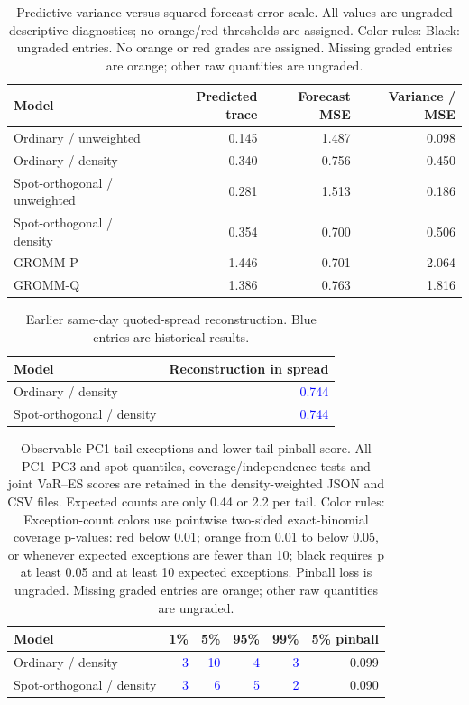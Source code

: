 \documentclass[11pt]{article}
\begin{document}
\begin{table}[H]\centering\small\setlength{\tabcolsep}{4pt}
\caption{Predictive variance versus squared forecast-error scale. All values are ungraded descriptive diagnostics; no orange/red thresholds are assigned. Color rules: Black: ungraded entries. No orange or red grades are assigned. Missing graded entries are orange; other raw quantities are ungraded.}\label{tab:density-calibration}
\begin{tabular}{@{}lrrr@{}}
\toprule
Model & Predicted trace & Forecast MSE & Variance / MSE \\
\midrule
Ordinary / unweighted & 0.145 & 1.487 & 0.098 \\
Ordinary / density & 0.340 & 0.756 & 0.450 \\
Spot-orthogonal / unweighted & 0.281 & 1.513 & 0.186 \\
Spot-orthogonal / density & 0.354 & 0.700 & 0.506 \\
GROMM-P & 1.446 & 0.701 & 2.064 \\
GROMM-Q & 1.386 & 0.763 & 1.816 \\
\bottomrule\end{tabular}\end{table}

\begin{table}[H]\centering\small
\caption{Earlier same-day quoted-spread reconstruction. Blue entries are historical results.}\label{tab:density-quotes}
\begin{tabular}{@{}lr@{}}\toprule Model & Reconstruction in spread \\
\midrule
Ordinary / density & \textcolor{blue}{0.744} \\
Spot-orthogonal / density & \textcolor{blue}{0.744} \\
\bottomrule\end{tabular}\end{table}

\begin{table}[H]\centering\small\setlength{\tabcolsep}{4pt}
\caption{Observable PC1 tail exceptions and lower-tail pinball score. All PC1--PC3 and spot quantiles, coverage/independence tests and joint VaR--ES scores are retained in the density-weighted JSON and CSV files. Expected counts are only 0.44 or 2.2 per tail. Color rules: Exception-count colors use pointwise two-sided exact-binomial coverage p-values: red below 0.01; orange from 0.01 to below 0.05, or whenever expected exceptions are fewer than 10; black requires p at least 0.05 and at least 10 expected exceptions. Pinball loss is ungraded. Missing graded entries are orange; other raw quantities are ungraded.}\label{tab:density-tails}
\begin{tabular}{@{}lrrrrr@{}}
\toprule
Model & 1\% & 5\% & 95\% & 99\% & 5\% pinball \\
\midrule
Ordinary / density & \textcolor{blue}{3} & \textcolor{blue}{10} & \textcolor{blue}{4} & \textcolor{blue}{3} & 0.099 \\
Spot-orthogonal / density & \textcolor{blue}{3} & \textcolor{blue}{6} & \textcolor{blue}{5} & \textcolor{blue}{2} & 0.090 \\
\bottomrule\end{tabular}\end{table}
\end{document}
